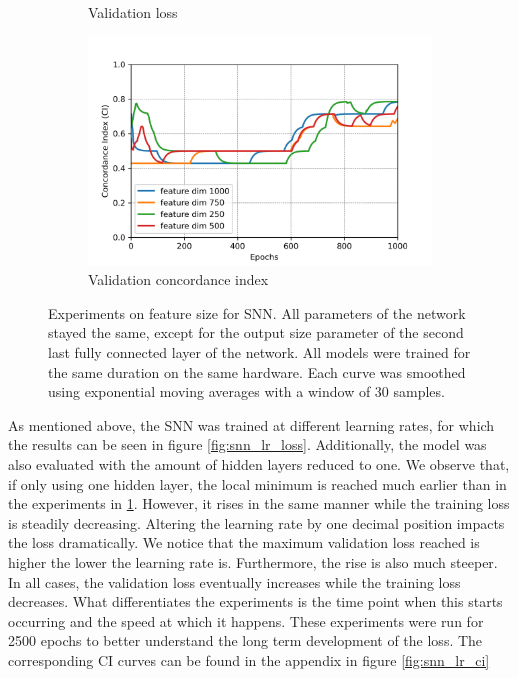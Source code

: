 \begin{figure}[h!t]
\begin{subfigure}[b]{0.49\textwidth}
         \caption{Validation loss}
     \end{subfigure}
    \hfill
     \begin{subfigure}[b]{0.49\textwidth}
         \centering
         \includegraphics[width=\textwidth]{latex/ci_plots/snn_fsz_val_ci.png}
         \caption{Validation concordance index}
     \end{subfigure}
    \hfill
    \caption[Experiments on feature size for SNN]{Experiments on feature size for SNN. All parameters of the network stayed the same, except for the output size parameter of the second last fully connected layer of the network. All models were trained for the same duration on the same hardware. Each curve was smoothed using exponential moving averages with a window of 30 samples.}
    \label{fig:snn_fsz}
\end{figure}

As mentioned above, the SNN was trained at different learning rates, for which the results can be seen in figure \ref{fig:snn_lr_loss}. Additionally, the model was also evaluated with the amount of hidden layers reduced to one. 
We observe that, if only using one hidden layer, the local minimum is reached much earlier than in the experiments in \ref{fig:snn_fsz}. However, it rises in the same manner while the training loss is steadily decreasing. Altering the learning rate by one decimal position impacts the loss dramatically. We notice that the maximum validation loss reached is higher the lower the learning rate is. Furthermore, the rise is also much steeper. In all cases, the validation loss eventually increases while the training loss decreases. What differentiates the experiments is the time point when this starts occurring and the speed at which it happens.
These experiments were run for 2500 epochs to better understand the long term development of the loss. The corresponding CI curves can be found in the appendix in figure \ref{fig:snn_lr_ci}

